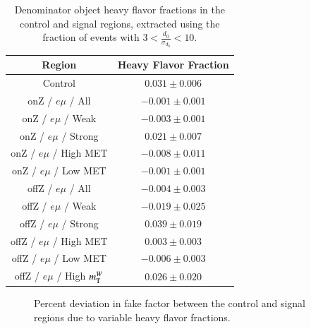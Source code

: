   \begin{table}
    \centering
    \begin{tabular}{cc}
      Region & Heavy Flavor Fraction \\
      \hline
      Control        &  $ 0.031 \pm  0.006$ \\
      onZ / $e\mu$ / All      &  $-0.001 \pm  0.001$ \\
      onZ / $e\mu$ / Weak     &  $-0.003 \pm  0.001$ \\
      onZ / $e\mu$ / Strong   &  $ 0.021 \pm  0.007$ \\
      onZ / $e\mu$ / High MET  &  $-0.008 \pm  0.011$ \\
      onZ / $e\mu$ / Low MET   &  $-0.001 \pm  0.001$ \\
      offZ / $e\mu$ / All     &  $-0.004 \pm  0.003$ \\
      offZ / $e\mu$ / Weak    &  $-0.019 \pm  0.025$ \\
      offZ / $e\mu$ / Strong  &  $ 0.039 \pm  0.019$ \\
      offZ / $e\mu$ / High MET &  $ 0.003 \pm  0.003$ \\
      offZ / $e\mu$ / Low MET  &  $-0.006 \pm  0.003$ \\
      offZ / $e\mu$ / High $m_{\mathrm{T}}^W$ &  $ 0.026 \pm  0.020$ \\
    \end{tabular}
    \caption{Denominator object heavy flavor fractions in the control and signal regions, extracted using the fraction of events with $3<\frac{d_0}{\sigma_{d_0}}<10$.}
    \label{t:el-ff-heavy-flavor-fractions}
  \end{table}


  \begin{figure}
    \centering
    \caption{Percent deviation in fake factor between the control and signal regions due to variable heavy flavor fractions.}
    \label{fig:el-ff-syst-hflf}
  \end{figure}
